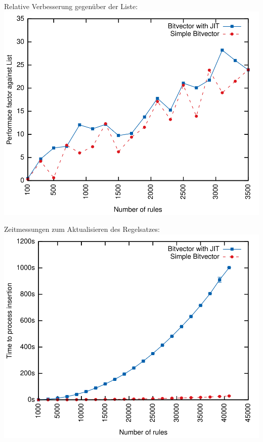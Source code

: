 \documentclass[xcolor=x11names,compress]{beamer}
\renewcommand{\(}{\begin{columns}}
\renewcommand{\)}{\end{columns}}
\newcommand{\<}[1]{\begin{column}{#1}}
\renewcommand{\>}{\end{column}}
\begin{document}
\begin{frame}
  Relative Verbesserung gegenüber der Liste:
  \includegraphics[height=0.9\textheight]{figures/eval_b_relative}
\end{frame}

\begin{frame}
  Zeitmessungen zum Aktualisieren des Regelsatzes:
  \includegraphics[height=0.9\textheight]{figures/eval_time}
\end{frame}
\end{document}
